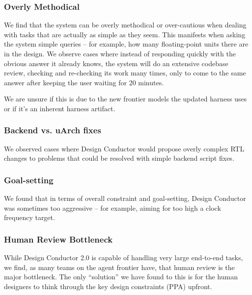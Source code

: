 \subsubsection{Overly Methodical}

We find that the system can be overly methodical or over-cautious when dealing with tasks that are actually as simple as they seem. This manifests when asking the system simple queries -- for example, how many floating-point units there are in the design. We observe cases where instead of responding quickly with the obvious answer it already knows, the system will do an extensive codebase review, checking and re-checking its work many times, only to come to the same answer after keeping the user waiting for 20 minutes.

We are unsure if this is due to the new frontier models the updated harness uses or if it's an inherent harness artifact. 

\subsubsection{Backend vs. uArch fixes}

We observed cases where Design Conductor would propose overly complex RTL changes to problems that could be resolved with simple backend script fixes.

\subsubsection{Goal-setting}

We found that in terms of overall constraint and goal-setting, Design Conductor was sometimes too aggressive -- for example, aiming for too high a clock frequency target. 

\subsubsection{Human Review Bottleneck}

While Design Conductor 2.0 is capable of handling very large end-to-end tasks, we find, as many teams on the agent frontier have, that human review is the major bottleneck. The only ``solution'' we have found to this is for the human designers to think through the key design constraints (PPA) upfront.